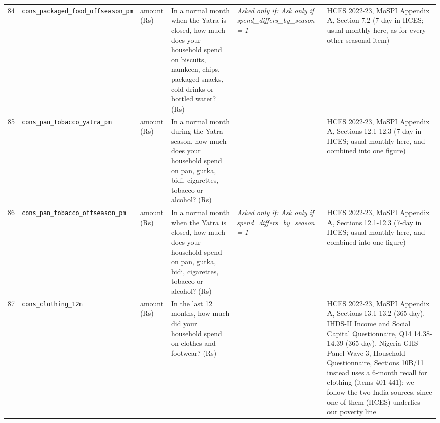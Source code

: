 \documentclass[9pt,a4paper,landscape]{article}
\begin{document}
\begin{longtable}{@{}p{0.5cm}p{3.3cm}p{1.7cm}p{7.3cm}p{5.6cm}p{5.4cm}@{}}
\footnotesize 84 & \footnotesize\texttt{cons\_packaged\_food\_offseason\_pm} & \scriptsize amount (Rs) & \footnotesize In a normal month when the Yatra is closed, how much does your household spend on biscuits, namkeen, chips, packaged snacks, cold drinks or bottled water? (Rs)\par\vspace{1pt}{\footnotesize\color{hdr}{\hifont जब यात्रा बंद रहती है, उस आम महीने में आपका घर बिस्किट, नमकीन, चिप्स, पैकेट वाले नाश्ते, कोल्ड ड्रिंक या बोतलबंद पानी पर कितना ख़र्च करता है? (रुपये)}} & \scriptsize \textit{Asked only if: Ask only if spend\_differs\_by\_season = 1} & \scriptsize HCES 2022-23, MoSPI Appendix A, Section 7.2 (7-day in HCES; usual monthly here, as for every other seasonal item)\\
\footnotesize 85 & \footnotesize\texttt{cons\_pan\_tobacco\_yatra\_pm} & \scriptsize amount (Rs) & \footnotesize In a normal month during the Yatra season, how much does your household spend on pan, gutka, bidi, cigarettes, tobacco or alcohol? (Rs)\par\vspace{1pt}{\footnotesize\color{hdr}{\hifont यात्रा के मौसम के आम महीने में, आप (और जो यहाँ आपके साथ रहते हैं) पान, गुटका, बीड़ी, सिगरेट, तंबाकू या शराब पर कितना ख़र्च करते हैं? (रुपये)}} & \scriptsize  & \scriptsize HCES 2022-23, MoSPI Appendix A, Sections 12.1-12.3 (7-day in HCES; usual monthly here, and combined into one figure)\\
\footnotesize 86 & \footnotesize\texttt{cons\_pan\_tobacco\_offseason\_pm} & \scriptsize amount (Rs) & \footnotesize In a normal month when the Yatra is closed, how much does your household spend on pan, gutka, bidi, cigarettes, tobacco or alcohol? (Rs)\par\vspace{1pt}{\footnotesize\color{hdr}{\hifont जब यात्रा बंद रहती है, उस आम महीने में आपका घर पान, गुटका, बीड़ी, सिगरेट, तंबाकू या शराब पर कितना ख़र्च करता है? (रुपये)}} & \scriptsize \textit{Asked only if: Ask only if spend\_differs\_by\_season = 1} & \scriptsize HCES 2022-23, MoSPI Appendix A, Sections 12.1-12.3 (7-day in HCES; usual monthly here, and combined into one figure)\\
\footnotesize 87 & \footnotesize\texttt{cons\_clothing\_12m} & \scriptsize amount (Rs) & \footnotesize In the last 12 months, how much did your household spend on clothes and footwear? (Rs)\par\vspace{1pt}{\footnotesize\color{hdr}{\hifont पिछले 12 महीनों में आपके घर ने कपड़ों और जूते-चप्पल पर कितना ख़र्च किया? (रुपये)}} & \scriptsize  & \scriptsize HCES 2022-23, MoSPI Appendix A, Sections 13.1-13.2 (365-day). IHDS-II Income and Social Capital Questionnaire, Q14 14.38-14.39 (365-day). Nigeria GHS-Panel Wave 3, Household Questionnaire, Sections 10B/11 instead uses a 6-month recall for clothing (items 401-441); we follow the two India sources, since one of them (HCES) underlies our poverty line\\

\end{longtable}
\end{document}
